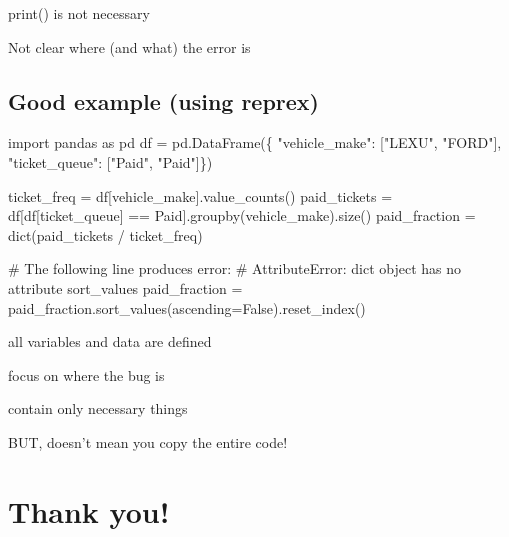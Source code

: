 \documentclass[
  letterpaper,
  DIV=11,
  numbers=noendperiod]{scrartcl}
\newenvironment{Shaded}{\begin{snugshade}}{\end{snugshade}}
\newcommand{\BuiltInTok}[1]{\textcolor[rgb]{0.00,0.23,0.31}{#1}}
\newcommand{\CommentTok}[1]{\textcolor[rgb]{0.37,0.37,0.37}{#1}}
\newcommand{\ImportTok}[1]{\textcolor[rgb]{0.00,0.46,0.62}{#1}}
\newcommand{\NormalTok}[1]{\textcolor[rgb]{0.00,0.23,0.31}{#1}}
\newcommand{\OperatorTok}[1]{\textcolor[rgb]{0.37,0.37,0.37}{#1}}
\newcommand{\StringTok}[1]{\textcolor[rgb]{0.13,0.47,0.30}{#1}}
\newcommand{\VariableTok}[1]{\textcolor[rgb]{0.07,0.07,0.07}{#1}}
\begin{document}
print() is not necessary

Not clear where (and what) the error is

\subsection{Good example (using
reprex)}\label{good-example-using-reprex}

\begin{Shaded}
\begin{Highlighting}[]
\ImportTok{import}\NormalTok{ pandas }\ImportTok{as}\NormalTok{ pd}
\NormalTok{df }\OperatorTok{=}\NormalTok{ pd.DataFrame(\{ }\StringTok{"vehicle\_make"}\NormalTok{: [}\StringTok{"LEXU"}\NormalTok{, }\StringTok{"FORD"}\NormalTok{],}
                    \StringTok{"ticket\_queue"}\NormalTok{: [}\StringTok{"Paid"}\NormalTok{, }\StringTok{"Paid"}\NormalTok{]\})}

\NormalTok{ticket\_freq }\OperatorTok{=}\NormalTok{ df[}\StringTok{\textquotesingle{}vehicle\_make\textquotesingle{}}\NormalTok{].value\_counts()}
\NormalTok{paid\_tickets }\OperatorTok{=}\NormalTok{ df[df[}\StringTok{\textquotesingle{}ticket\_queue\textquotesingle{}}\NormalTok{] }\OperatorTok{==} \StringTok{\textquotesingle{}Paid\textquotesingle{}}\NormalTok{].groupby(}\StringTok{\textquotesingle{}vehicle\_make\textquotesingle{}}\NormalTok{).size()}
\NormalTok{paid\_fraction }\OperatorTok{=} \BuiltInTok{dict}\NormalTok{(paid\_tickets }\OperatorTok{/}\NormalTok{ ticket\_freq)}

\CommentTok{\# The following line produces error:}
\CommentTok{\# AttributeError: \textquotesingle{}dict\textquotesingle{} object has no attribute \textquotesingle{}sort\_values\textquotesingle{}}
\NormalTok{paid\_fraction }\OperatorTok{=}\NormalTok{ paid\_fraction.sort\_values(ascending}\OperatorTok{=}\VariableTok{False}\NormalTok{).reset\_index()}
\end{Highlighting}
\end{Shaded}

all variables and data are defined

focus on where the bug is

contain only necessary things

BUT, doesn't mean you copy the entire code!

\section{Thank you!}\label{thank-you}
\end{document}
